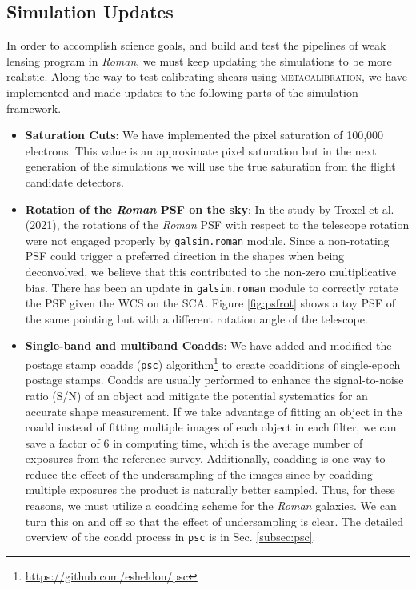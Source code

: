 \documentclass[fleqn,usenatbib]{mnras}
\begin{document}
\subsection{Simulation Updates}
In order to accomplish science goals, and build and test the pipelines of weak lensing program in \emph{Roman}, we must keep updating the simulations to be more realistic. Along the way to test calibrating shears using \textsc{metacalibration}, we have implemented and made updates to the following parts of the simulation framework. 
\begin{itemize}
    \setlength\itemsep{1em}
    \item \textbf{Saturation Cuts}:
    We have implemented the pixel saturation of 100,000 electrons. This value is an approximate pixel saturation but in the next generation of the simulations we will use the true saturation from the flight candidate detectors. 
    \item \textbf{Rotation of the \emph{Roman} PSF on the sky}:
    In the study by Troxel et al. (2021), the rotations of the \emph{Roman} PSF with respect to the telescope rotation were not engaged properly by \texttt{galsim.roman} module. Since a non-rotating PSF could trigger a preferred direction in the shapes when being deconvolved, we believe that this contributed to the non-zero multiplicative bias. There has been an update in \texttt{galsim.roman} module to correctly rotate the PSF given the WCS on the SCA. Figure \ref{fig:psfrot} shows a toy PSF of the same pointing but with a different rotation angle of the telescope. 
    \item \textbf{Single-band and multiband Coadds}: 
    We have added and modified the postage stamp coadds (\texttt{psc}) algorithm\footnote{\url{https://github.com/esheldon/psc}} to create coadditions of single-epoch postage stamps. Coadds are usually performed to enhance the signal-to-noise ratio (S/N) of an object and mitigate the potential systematics for an accurate shape measurement. If we take advantage of fitting an object in the coadd instead of fitting multiple images of each object in each filter, we can save a factor of 6 in computing time, which is the average number of exposures from the reference survey. Additionally, coadding is one way to reduce the effect of the undersampling of the images since by coadding multiple exposures the product is naturally better sampled. Thus, for these reasons, we must utilize a coadding scheme for the \emph{Roman} galaxies. We can turn this on and off so that the effect of undersampling is clear. The detailed overview of the coadd process in \texttt{psc} is in Sec. \ref{subsec:psc}. 

\end{itemize}
\end{document}

